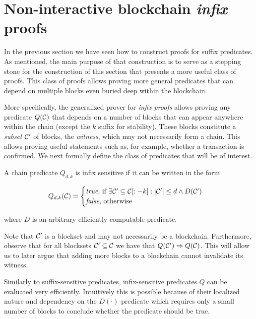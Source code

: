 \section{Non-interactive blockchain \emph{infix} proofs}
\label{sec:infix}

In the previous section we have seen how to construct proofs for suffix
predicates. As mentioned, the main purpose of that construction is to serve as a
stepping stone for the construction of this section that presents a more useful
class of proofs. This class of proofs allows proving more general predicates
that can depend on multiple blocks even buried deep within the blockchain.

More specifically, the generalized prover for \emph{infix proofs} allows
proving any predicate $Q(\mathcal{C})$ that depends on a number of blocks that can
appear anywhere within the chain (except the $k$ suffix for stability). These
blocks constitute a \emph{subset} $\mathcal{C}'$ of blocks, the \emph{witness},
which may not necessarily form a chain. This allows proving useful statements
such as, for example, whether a transaction is confirmed. We next formally
define the class of predicates that will be of interest.

\begin{definition}
\label{def:infix}
A chain predicate $Q_{d,k}$ is \textnormal{infix sensitive} if it can be
written in the form

$$
Q_{d,k}(\mathcal{C}) =
\begin{cases}
  \text{\emph{true}, if }
    \exists \mathcal{C}' \subseteq \mathcal{C}[:-k]: |\mathcal{C}'| \leq d \land D(\mathcal{C}')\\
  \text{\emph{false}, otherwise}
\end{cases}
$$

where $D$ is an arbitrary efficiently computable predicate.
\end{definition}

Note that $\mathcal{C}'$ is a blockset and may not necessarily be a blockchain.
Furthermore, observe that for all blocksets $\mathcal{C}' \subseteq \mathcal{C}$ we have
that $Q(\mathcal{C}') \Rightarrow Q(\mathcal{C})$. This will allow us to later argue that
adding more blocks to a blockchain cannot invalidate its witness.

Similarly to suffix-sensitive predicates, infix-sensitive predicates $Q$ can be
evaluated very efficiently. Intuitively this is possible because of their
localized nature and dependency on the $D(\cdot)$ predicate which requires only
a small number of blocks to conclude whether the predicate should be true.

